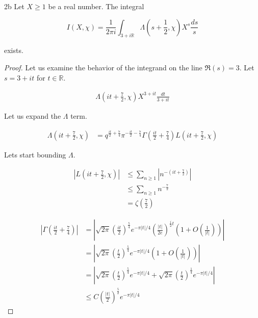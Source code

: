 \documentclass{article}
\newcommand{\R}{\mathbb{R}}
\newcommand{\abs}[1]{\left\lvert #1\right\rvert}
\begin{document}
\begin{claim}{2b}\label{Claim 2b.}
    Let $X \geq 1$ be a real number. The integral
    
    \[I(X, \chi) = \frac{1}{2\pi i} \int_{3 + i\R}\Lambda(s + \frac{1}{2}, \chi)X^s \frac{ds}{s}\]

    exists. 
\end{claim}
\begin{proof}
    Let us examine the behavior of the integrand on the line $\Re(s) = 3$. Let $s = 3 + it$ for $t \in \R$. 
    
    \begin{align*}
        \Lambda(it + \frac{7}{2}, \chi) X^{3 + it} \frac{dt}{3 + it}
    \end{align*}

    Let us expand the $\Lambda$ term.  

    \begin{align*}
        \Lambda(it + \frac{7}{2}, \chi) &= q^{\frac{it}{2} + \frac{7}{4}} \pi^{-\frac{it}{2} - \frac{7}{4}}\Gamma\left(\frac{it}{2} + \frac{7}{4}\right)L(it + \frac{7}{2}, \chi) 
    \end{align*}

    Lets start bounding $\Lambda$.  

    \begin{align*}
        \abs{L(it + \frac{7}{2}, \chi)} &\leq \sum_{n \geq 1}\abs{n^{-\left(it + \frac{7}{2}\right)}} \\
        &\leq \sum_{n \geq 1}n^{-\frac{7}{2}} \\
        &= \zeta\left(\frac{7}{2}\right)
    \end{align*}

    \begin{align*}
        \abs{\Gamma\left(\frac{it}{2} + \frac{7}{4}\right)} &= \abs{\sqrt{2\pi}\left(\frac{it}{2}\right)^{\frac{5}{4}}e^{-\pi \abs{t}/4} \left(\frac{\abs{t}}{2e}\right)^{\frac{i}{2}t}\left(1 + O\left(\frac{1}{\abs{t}}\right)\right)} \\
        &= \abs{\sqrt{2\pi}\left(\frac{t}{2}\right)^{\frac{5}{4}}e^{-\pi \abs{t}/4} \left(1 + O\left(\frac{1}{\abs{t}}\right)\right)} \\
        &= \abs{\sqrt{2\pi}\left(\frac{t}{2}\right)^{\frac{5}{4}}e^{-\pi \abs{t}/4} + \sqrt{2\pi}\left(\frac{t}{2}\right)^{\frac{1}{4}}e^{-\pi \abs{t}/4} } \\
        &\leq C \left(\frac{\abs{t}}{2}\right)^{\frac{5}{2}} e^{- \pi \abs{t} / 4}
    \end{align*}


\end{proof}
\end{document}
